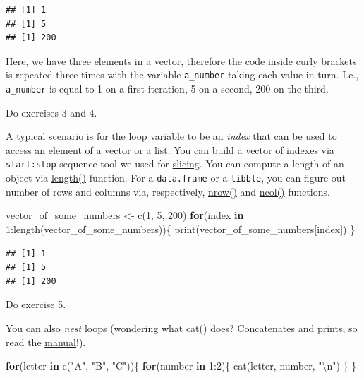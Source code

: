 \documentclass[
]{book}
\newenvironment{Shaded}{\begin{snugshade}}{\end{snugshade}}
\newcommand{\ControlFlowTok}[1]{\textcolor[rgb]{0.13,0.29,0.53}{\textbf{#1}}}
\newcommand{\DecValTok}[1]{\textcolor[rgb]{0.00,0.00,0.81}{#1}}
\newcommand{\FunctionTok}[1]{\textcolor[rgb]{0.00,0.00,0.00}{#1}}
\newcommand{\NormalTok}[1]{#1}
\newcommand{\OtherTok}[1]{\textcolor[rgb]{0.56,0.35,0.01}{#1}}
\newcommand{\SpecialCharTok}[1]{\textcolor[rgb]{0.00,0.00,0.00}{#1}}
\newcommand{\StringTok}[1]{\textcolor[rgb]{0.31,0.60,0.02}{#1}}
\begin{document}
\begin{verbatim}
## [1] 1
## [1] 5
## [1] 200
\end{verbatim}

Here, we have three elements in a vector, therefore the code inside curly brackets is repeated three times with the variable \texttt{a\_number} taking each value in turn. I.e., \texttt{a\_number} is equal to 1 on a first iteration, 5 on a second, 200 on the third.

Do exercises 3 and 4.

A typical scenario is for the loop variable to be an \emph{index} that can be used to access an element of a vector or a list. You can build a vector of indexes via \texttt{start:stop} sequence tool we used for \protect\hyperlink{vector-index-slicing}{slicing}. You can compute a length of an object via \href{https://stat.ethz.ch/R-manual/R-devel/library/base/html/length.html}{length()} function. For a \texttt{data.frame} or a \texttt{tibble}, you can figure out number of rows and columns via, respectively, \href{https://stat.ethz.ch/R-manual/R-devel/library/base/html/nrow.html}{nrow()} and \href{https://stat.ethz.ch/R-manual/R-devel/library/base/html/nrow.html}{ncol()} functions.

\begin{Shaded}
\begin{Highlighting}[]
\NormalTok{vector\_of\_some\_numbers }\OtherTok{\textless{}{-}} \FunctionTok{c}\NormalTok{(}\DecValTok{1}\NormalTok{, }\DecValTok{5}\NormalTok{, }\DecValTok{200}\NormalTok{)}
\ControlFlowTok{for}\NormalTok{(index }\ControlFlowTok{in} \DecValTok{1}\SpecialCharTok{:}\FunctionTok{length}\NormalTok{(vector\_of\_some\_numbers))\{}
  \FunctionTok{print}\NormalTok{(vector\_of\_some\_numbers[index])}
\NormalTok{\}}
\end{Highlighting}
\end{Shaded}

\begin{verbatim}
## [1] 1
## [1] 5
## [1] 200
\end{verbatim}

Do exercise 5.

You can also \emph{nest} loops (wondering what \href{https://stat.ethz.ch/R-manual/R-devel/library/base/html/cat.html}{cat()} does? Concatenates and prints, so read the \href{https://stat.ethz.ch/R-manual/R-devel/library/base/html/cat.html}{manual}!).

\begin{Shaded}
\begin{Highlighting}[]
\ControlFlowTok{for}\NormalTok{(letter }\ControlFlowTok{in} \FunctionTok{c}\NormalTok{(}\StringTok{"A"}\NormalTok{, }\StringTok{"B"}\NormalTok{, }\StringTok{"C"}\NormalTok{))\{}
  \ControlFlowTok{for}\NormalTok{(number }\ControlFlowTok{in} \DecValTok{1}\SpecialCharTok{:}\DecValTok{2}\NormalTok{)\{}
    \FunctionTok{cat}\NormalTok{(letter, number, }\StringTok{"}\SpecialCharTok{\textbackslash{}n}\StringTok{"}\NormalTok{)}
\NormalTok{  \}}
\NormalTok{\}}
\end{Highlighting}
\end{Shaded}
\end{document}
